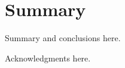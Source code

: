 \documentclass{aastex701}
\begin{document}
\section{Summary}
\label{sec:summary}
Summary and conclusions here.

\begin{acknowledgments}
Acknowledgments here.
\end{acknowledgments}



{}

\end{document}
